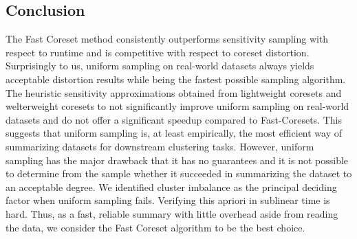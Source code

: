 

\subsection{Conclusion}

The Fast Coreset method consistently outperforms sensitivity sampling with respect to runtime and is competitive with respect to coreset distortion.
Surprisingly to us, uniform sampling on real-world datasets always yields acceptable distortion results while being the fastest possible sampling algorithm. The
heuristic sensitivity approximations obtained from lightweight coresets and welterweight coresets to not significantly improve uniform sampling on real-world
datasets and do not offer a significant speedup compared to Fast-Coresets.  This suggests that uniform sampling is, at least empirically, the most efficient way
of summarizing datasets for downstream clustering tasks. However, uniform sampling has the major drawback that it has no guarantees and it is not possible to
determine from the sample whether it succeeded in summarizing the dataset to an acceptable degree. We identified cluster imbalance as the principal deciding
factor when uniform sampling fails. Verifying this apriori in sublinear time is hard.  Thus, as a fast, reliable summary with little overhead aside from reading
the data, we consider the Fast Coreset algorithm to be the best choice.




